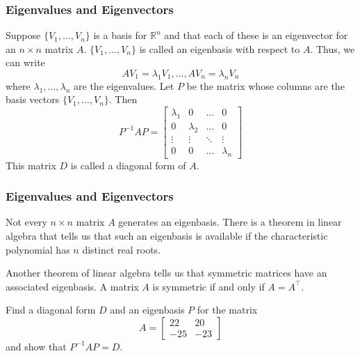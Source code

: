 \documentclass[xcolor=dvipsnames]{beamer}
\begin{document}
\begin{frame}
  \frametitle{Eigenvalues and Eigenvectors}
  Suppose $\{V_{1},{\ldots},V_{n}\}$ is a basis for $\mathbb{R}^{n}$
  and that each of these is an eigenvector for an $n\times{}n$ matrix
  $A$. $\{V_{1},{\ldots},V_{n}\}$ is called an \alert{eigenbasis} with
  respect to $A$. Thus, we can write
  \begin{equation}
    \label{eq:chucarie}
    AV_{1}=\lambda_{1}V_{1},{\ldots},AV_{n}=\lambda_{n}V_{n}
  \end{equation}
where $\lambda_{1},{\ldots},\lambda_{n}$ are the eigenvalues. Let $P$
be the matrix whose columns are the basis vectors
$\{V_{1},{\ldots},V_{n}\}$. Then
\begin{equation}
  \label{eq:ahzieyuc}
  P^{-1}AP=\left[
    \begin{array}{cccc}
      \lambda_{1}&0&\ldots&0 \\
      0&\lambda_{2}&\ldots&0 \\
      \vdots & \vdots & \ddots & \vdots \\
      0 & 0 & \ldots & \lambda_{n}
    \end{array}\right]
\end{equation}
This matrix $D$ is called a \alert{diagonal form} of $A$.
\end{frame}

\begin{frame}
  \frametitle{Eigenvalues and Eigenvectors}
  Not every $n\times{}n$ matrix $A$ generates an eigenbasis. There is
  a theorem in linear algebra that tells us that such an eigenbasis is
  available if the characteristic polynomial has $n$ distinct real
  roots.

  \bigskip

  Another theorem of linear algebra tells us that symmetric matrices
  have an associated eigenbasis. A matrix $A$ is symmetric if and only
  if $A=A^{\intercal}$.

  \bigskip

  {\ubung} Find a diagonal form $D$ and an eigenbasis $P$ for the matrix
  \begin{equation}
    \label{eq:nohyaesu}
    A=\left[
      \begin{array}{cc}
        22&20 \\
        -25&-23
      \end{array}\right]
  \end{equation}
  and show that $P^{-1}AP=D$.
\end{frame}
\end{document}
